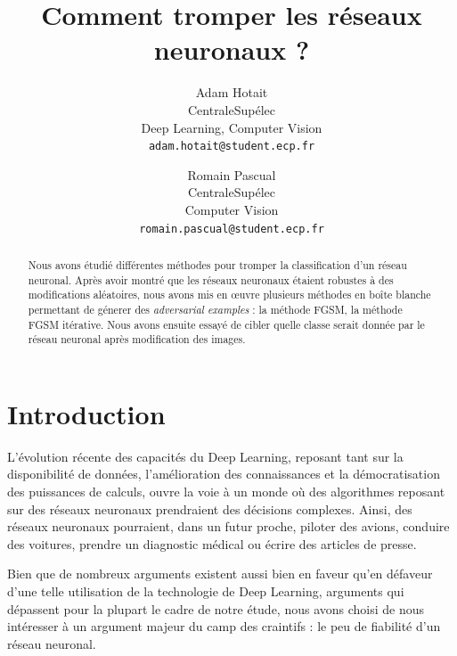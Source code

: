 \documentclass[10pt,twocolumn,letterpaper]{article}
\begin{document}
\title{Comment tromper les réseaux neuronaux ?}

\author{Adam Hotait\\
CentraleSupélec\\
Deep Learning, Computer Vision\\
{\tt\small adam.hotait@student.ecp.fr}
\and
Romain Pascual\\
CentraleSupélec\\
Computer Vision\\
{\tt\small romain.pascual@student.ecp.fr}
}

\maketitle

\begin{abstract}
   Nous avons étudié différentes méthodes pour tromper la classification d'un réseau neuronal. Après avoir montré que les réseaux neuronaux étaient robustes à des modifications aléatoires, nous avons mis en œuvre plusieurs méthodes en \og boîte blanche \fg{} permettant de génerer des \textit{adversarial examples} : la méthode FGSM, la méthode FGSM itérative. Nous avons ensuite essayé de cibler quelle classe serait donnée par le réseau neuronal après modification des images.
\end{abstract}

\section{Introduction}

L'évolution récente des capacités du Deep Learning, reposant tant sur la disponibilité de données, l'amélioration des connaissances et la démocratisation des puissances de calculs, ouvre la voie à un monde où des algorithmes reposant sur des réseaux neuronaux prendraient des décisions complexes. Ainsi, des réseaux neuronaux pourraient, dans un futur proche, piloter des avions, conduire des voitures, prendre un diagnostic médical ou écrire des articles de presse.

Bien que de nombreux arguments existent aussi bien en faveur qu'en défaveur d'une telle utilisation de la technologie de Deep Learning, arguments qui dépassent pour la plupart le cadre de notre étude, nous avons choisi de nous intéresser à un argument majeur du camp des craintifs : le peu de fiabilité d'un réseau neuronal.
\end{document}
